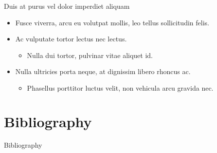 \documentclass{beamer} %
\begin{document}
  \begin{frame}{Duis at purus vel dolor imperdiet aliquam}
    \begin{itemize}
      \item<1-2> Fusce viverra, arcu eu volutpat mollis, leo tellus sollicitudin felis.
      \item<2-5> Ac vulputate tortor lectus nec lectus.
      \begin{itemize}
	\item<3>  Nulla dui tortor, pulvinar vitae aliquet id.
      \end{itemize}
      \item<4-5> Nulla ultricies porta neque, at dignissim libero rhoncus ac.
      \begin{itemize}
	\item<5-> Phasellus porttitor luctus velit, non vehicula arcu gravida nec.
      \end{itemize}
    \end{itemize}
  \end{frame}

\section*{Bibliography}
  \begin{frame}[allowframebreaks]{Bibliography}
    \beamertemplatearticlebibitems
    
    
  \end{frame}

\end{document}
